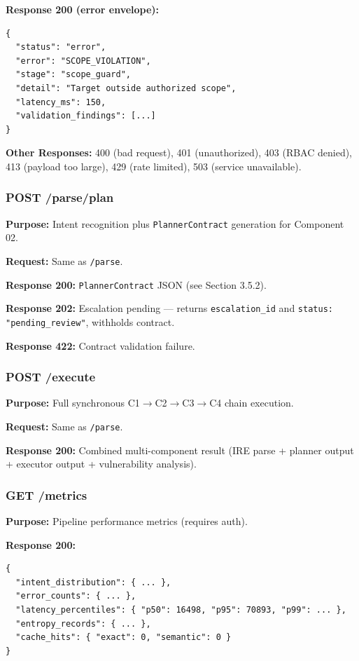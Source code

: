 \documentclass[10pt,journal,onecolumn]{IEEEtran}
\begin{document}
\textbf{Response 200 (error envelope):}
\begin{lstlisting}
{
  "status": "error",
  "error": "SCOPE_VIOLATION",
  "stage": "scope_guard",
  "detail": "Target outside authorized scope",
  "latency_ms": 150,
  "validation_findings": [...]
}
\end{lstlisting}

\textbf{Other Responses:} 400 (bad request), 401 (unauthorized), 403 (RBAC denied), 413 (payload too large), 429 (rate limited), 503 (service unavailable).

\subsubsection{POST /parse/plan}
\textbf{Purpose:} Intent recognition plus \texttt{PlannerContract} generation for Component 02.

\textbf{Request:} Same as \texttt{/parse}.

\textbf{Response 200:} \texttt{PlannerContract} JSON (see Section 3.5.2).

\textbf{Response 202:} Escalation pending --- returns \texttt{escalation\_id} and \texttt{status: "pending\_review"}, withholds contract.

\textbf{Response 422:} Contract validation failure.

\subsubsection{POST /execute}
\textbf{Purpose:} Full synchronous C1$\rightarrow$C2$\rightarrow$C3$\rightarrow$C4 chain execution.

\textbf{Request:} Same as \texttt{/parse}.

\textbf{Response 200:} Combined multi-component result (IRE parse + planner output + executor output + vulnerability analysis).

\subsubsection{GET /metrics}
\textbf{Purpose:} Pipeline performance metrics (requires auth).

\textbf{Response 200:}
\begin{lstlisting}
{
  "intent_distribution": { ... },
  "error_counts": { ... },
  "latency_percentiles": { "p50": 16498, "p95": 70893, "p99": ... },
  "entropy_records": { ... },
  "cache_hits": { "exact": 0, "semantic": 0 }
}
\end{lstlisting}
\end{document}
